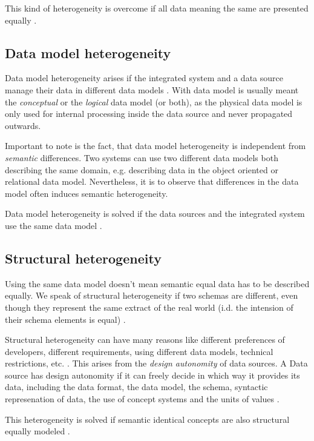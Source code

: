 This kind of heterogeneity is overcome if all data meaning the same are presented equally \cite[p. 61]{DBLP:books/dp/LeserN2006}.

\subsection{Data model  heterogeneity}
Data model heterogeneity arises if the integrated system and a data source manage their data in different data models \cite[p. 65]{DBLP:books/dp/LeserN2006}. With data model is usually meant the \emph{conceptual} or the \emph{logical} data model (or both), as the physical data model is only used for internal processing inside the data source and never propagated outwards.

Important to note is the fact, that data model heterogeneity is independent from \emph{semantic} differences. Two systems can use two different data models both describing the same domain, e.g. describing data in the object oriented or relational data model. Nevertheless, it is to observe that differences in the data model often induces semantic heterogeneity.

Data model heterogeneity is solved if the data sources and the integrated system use the same data model \cite[p. 61]{DBLP:books/dp/LeserN2006}.

\subsection{Structural  heterogeneity}
Using the same data model doesn't mean semantic equal data has to be described equally. We speak of structural heterogeneity if two schemas are different, even though they represent the same extract of the real world (i.d. the intension of their schema elements is equal) \cite[p. 67]{DBLP:books/dp/LeserN2006}. 

Structural heterogeneity can have many reasons like different preferences of developers, different requirements, using different data models, technical restrictions, etc. . This arises from the \textit{design autonomity} of data sources. A Data source has design autonomity if it can freely decide in which way it provides its data, including the data format, the data model, the schema, syntactic represenation of data, the use of concept systems and the units of values \cite[p.55]{DBLP:books/dp/LeserN2006}.

This heterogeneity is solved if semantic identical concepts are also structural equally modeled  \cite[p. 61]{DBLP:books/dp/LeserN2006}.

